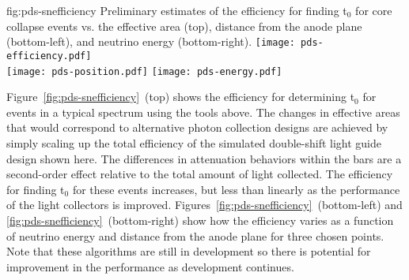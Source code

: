 \begin{dunefigure}{fig:pds-snefficiency}
{Preliminary estimates of the efficiency for finding t$_0$ for core collapse  events vs. the effective area (top), distance from the anode plane (bottom-left), and neutrino energy (bottom-right).}
  \texttt{[image: pds-efficiency.pdf]}\\
  \texttt{[image: pds-position.pdf]}
  \texttt{[image: pds-energy.pdf]}
\end{dunefigure}


Figure~\ref{fig:pds-snefficiency}~(top) shows the efficiency for determining t$_0$ for events in a typical  spectrum using the tools above. The changes in effective areas that would correspond to alternative photon collection designs are achieved by simply scaling up the total efficiency of the simulated double-shift light guide design shown here. The differences in attenuation behaviors within the bars are a second-order effect relative to the total amount of light collected. The efficiency for finding t$_0$ for these events increases, but less than linearly as the performance of the light collectors is improved. Figures~\ref{fig:pds-snefficiency}~(bottom-left) and \ref{fig:pds-snefficiency}~(bottom-right) show how the efficiency varies as a function of neutrino energy and distance from the anode plane for three chosen points. Note that these algorithms are still in development so there is potential for improvement in the performance as development continues.

